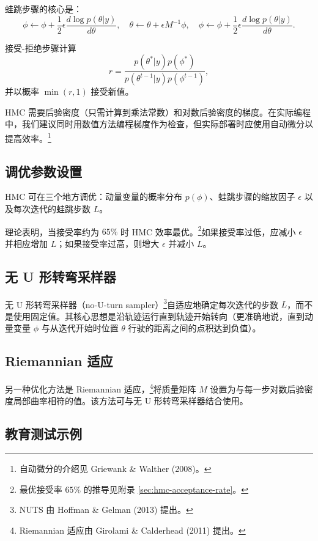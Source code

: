蛙跳步骤的核心是：
\[
\phi \gets \phi + \frac{1}{2} \epsilon \frac{d \log p(\theta | y)}{d \theta}, \quad
\theta \gets \theta + \epsilon M^{-1} \phi, \quad
\phi \gets \phi + \frac{1}{2} \epsilon \frac{d \log p(\theta | y)}{d \theta}.
\]

接受-拒绝步骤计算
\[
r = \frac{p(\theta^* | y) p(\phi^*)}{p(\theta^{t-1} | y) p(\phi^{t-1})},
\]
并以概率 $\min(r, 1)$ 接受新值。

\begin{Remark}
  HMC 需要后验密度（只需计算到乘法常数）和对数后验密度的梯度。在实际编程中，我们建议同时用数值方法编程梯度作为检查，但实际部署时应使用自动微分以提高效率。\footnote{自动微分的介绍见 Griewank \& Walther (2008)。}
\end{Remark}

\subsection{调优参数设置}

HMC 可在三个地方调优：动量变量的概率分布 $p(\phi)$、蛙跳步骤的缩放因子 $\epsilon$ 以及每次迭代的蛙跳步数 $L$。

理论表明，当接受率约为 $65\%$ 时 HMC 效率最优。\footnote{最优接受率 $65\%$ 的推导见附录 \cref{sec:hmc-acceptance-rate}。}如果接受率过低，应减小 $\epsilon$ 并相应增加 $L$；如果接受率过高，则增大 $\epsilon$ 并减小 $L$。

\subsection{无 U 形转弯采样器}

无 U 形转弯采样器（no-U-turn sampler）\footnote{NUTS 由 Hoffman \& Gelman (2013) 提出。}自适应地确定每次迭代的步数 $L$，而不是使用固定值。其核心思想是沿轨迹运行直到轨迹开始转向（更准确地说，直到动量变量 $\phi$ 与从迭代开始时位置 $\theta$ 行驶的距离之间的点积达到负值）。

\subsection{Riemannian 适应}

另一种优化方法是 Riemannian 适应，\footnote{Riemannian 适应由 Girolami \& Calderhead (2011) 提出。}将质量矩阵 $M$ 设置为与每一步对数后验密度局部曲率相符的值。该方法可与无 U 形转弯采样器结合使用。

\subsection{教育测试示例}

